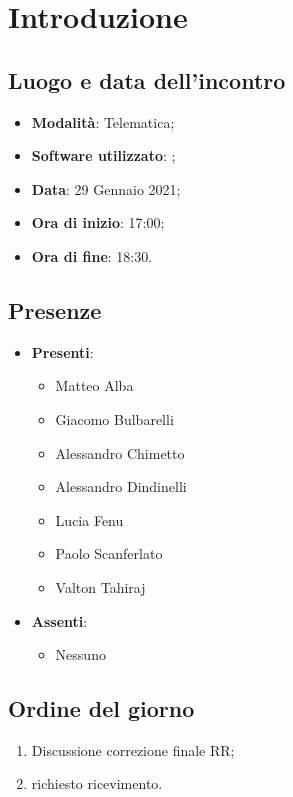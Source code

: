 \documentclass[]{article}
\begin{document}
	
	
	
	\newpage
	
	
		\section{Introduzione}
		\subsection{Luogo e data dell'incontro}
		\begin{itemize}
			\item \textbf{Modalità}: Telematica;
			\item \textbf{Software utilizzato}: ;
			\item \textbf{Data}: 29 Gennaio 2021;
			\item \textbf{Ora di inizio}: 17:00;
			\item \textbf{Ora di fine}: 18:30.
		\end{itemize}

		\subsection{Presenze}
		\begin{itemize}
			\item \textbf{Presenti}:
			\begin{itemize}
				\item Matteo Alba
				\item Giacomo Bulbarelli
				\item Alessandro Chimetto
				\item Alessandro Dindinelli
				\item Lucia Fenu
				\item Paolo Scanferlato
				\item Valton Tahiraj
			\end{itemize}
			\item \textbf{Assenti}:
			\begin{itemize}
				\item Nessuno
			\end{itemize}
		\end{itemize}


		\subsection{Ordine del giorno}
		\begin{enumerate}
			\item Discussione correzione finale RR;
			\item richiesto ricevimento.
		\end{enumerate}
\end{document}
